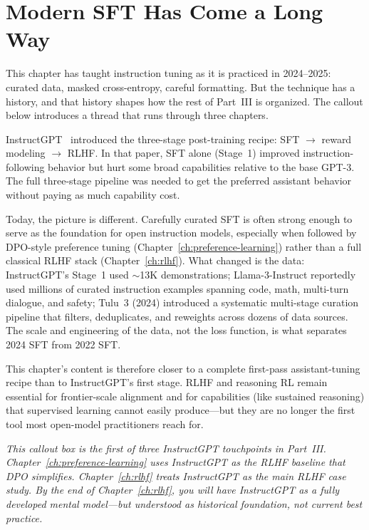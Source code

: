 \section{Modern SFT Has Come a Long Way}
\label{sec:instructgpt-callout}

This chapter has taught instruction tuning as it is practiced in 2024--2025: curated data, masked cross-entropy, careful formatting. But the technique has a history, and that history shapes how the rest of Part~III is organized. The callout below introduces a thread that runs through three chapters.

\begin{tcolorbox}[colback=orange!5, colframe=orange!60, title=\textbf{The InstructGPT Thread --- Preview}]
InstructGPT~\cite{ouyang2022instructgpt} introduced the three-stage post-training recipe: SFT $\to$ reward modeling $\to$ RLHF. In that paper, SFT alone (Stage~1) improved instruction-following behavior but hurt some broad capabilities relative to the base GPT-3. The full three-stage pipeline was needed to get the preferred assistant behavior without paying as much capability cost.

\medskip
Today, the picture is different. Carefully curated SFT is often strong enough to serve as the foundation for open instruction models, especially when followed by DPO-style preference tuning (Chapter~\ref{ch:preference-learning}) rather than a full classical RLHF stack (Chapter~\ref{ch:rlhf}). What changed is the data: InstructGPT's Stage~1 used $\sim$13K demonstrations; Llama-3-Instruct reportedly used millions of curated instruction examples spanning code, math, multi-turn dialogue, and safety; Tulu~3 (2024) introduced a systematic multi-stage curation pipeline that filters, deduplicates, and reweights across dozens of data sources. The scale and engineering of the data, not the loss function, is what separates 2024 SFT from 2022 SFT.

\medskip
This chapter's content is therefore closer to a complete first-pass assistant-tuning recipe than to InstructGPT's first stage. RLHF and reasoning RL remain essential for frontier-scale alignment and for capabilities (like sustained reasoning) that supervised learning cannot easily produce---but they are no longer the first tool most open-model practitioners reach for.

\medskip
\emph{This callout box is the first of three InstructGPT touchpoints in Part~III. Chapter~\ref{ch:preference-learning} uses InstructGPT as the RLHF baseline that DPO simplifies. Chapter~\ref{ch:rlhf} treats InstructGPT as the main RLHF case study. By the end of Chapter~\ref{ch:rlhf}, you will have InstructGPT as a fully developed mental model---but understood as historical foundation, not current best practice.}
\end{tcolorbox}

